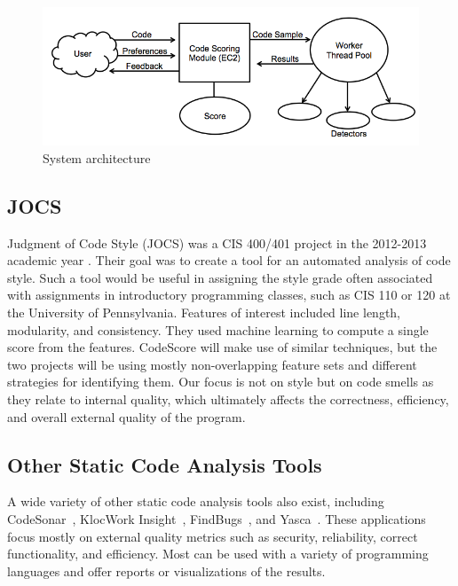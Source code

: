 \documentclass{sig-alternate}
\begin{document}
\begin{figure}[ht]
	\begin{center}
		\includegraphics[width=0.9\linewidth]{block_diagram}
	\end{center}
	\vspace{-12pt}
	\caption{System architecture}
	\label{fig:some_graph}
\end{figure}

\subsection{JOCS}
Judgment of Code Style (JOCS) was a CIS 400/401 project in the 2012-2013
academic year \cite{close2013jocs}. Their goal was to create a tool for an automated
analysis of code style. Such a tool would be useful in assigning the style grade
often associated with assignments in introductory programming classes, such as
CIS 110 or 120 at the University of Pennsylvania. Features of interest included
line length, modularity, and consistency. They used machine learning to compute
a single score from the features. CodeScore will make use of similar techniques,
but the two projects will be using mostly non-overlapping feature sets and
different strategies for identifying them. Our focus is not on style but on code
smells as they relate to internal quality, which ultimately affects the
correctness, efficiency, and overall external quality of the program. 

\subsection{Other Static Code Analysis Tools}
A wide variety of other static code analysis tools also exist, including
CodeSonar~\cite{grammatech2013codesonar}, KlocWork Insight~\cite{klocwork2013insight},
FindBugs~\cite{pugh2013findbugs}, and Yasca~\cite{scovetta2007yasca}. These
applications focus mostly on external quality metrics such as security,
reliability, correct functionality, and efficiency. Most can be used with a variety of
programming languages and offer reports or visualizations of the results.
\end{document}
